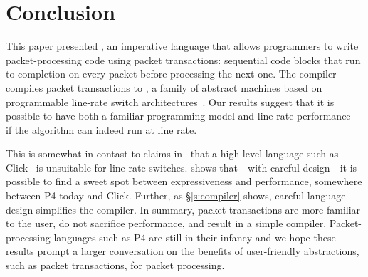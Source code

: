 \section{Conclusion}
\label{s:conclusion}

This paper presented \pktlanguage, an imperative language that allows
programmers to write packet-processing code using packet transactions:
sequential code blocks that run to completion on every packet before processing
the next one. The \pktlanguage compiler compiles packet transactions
to \absmachine, a family of abstract machines based on
programmable line-rate switch architectures~\cite{flexpipe, xpliant, rmt}. Our
results suggest that it is possible to have both a familiar programming model
and line-rate performance---if the algorithm can indeed run at line rate.

This is somewhat in contast to claims in~\cite{p4} that a high-level language
such as Click~\cite{click} is unsuitable for line-rate switches. \pktlanguage
shows that---with careful design---it is possible to find a sweet spot between
expressiveness and performance, somewhere between P4 today and Click. Further,
as \S\ref{s:compiler} shows, careful language design simplifies the compiler.
In summary, packet transactions are more familiar to the user, do not sacrifice
performance, and result in a simple compiler.  Packet-processing languages such
as P4 are still in their infancy and we hope these results prompt a larger
conversation on the benefits of user-friendly abstractions, such as packet
transactions, for packet processing.
